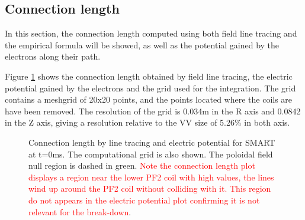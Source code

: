 \documentclass[a4paper,12pt,oneside]{book}
\begin{document}
\subsection{Connection length}

In this section, the connection length computed using both field line tracing and the empirical formula will be showed, as well as the potential gained by the electrons along their path.

Figure \ref{fig_L_int} shows the connection length obtained by field line tracing, the electric potential gained by the electrons and the grid used for the integration. The grid contains a meshgrid of 20x20 points, and the points located where the coils are have been removed. The resolution of the grid is 0.034m in the R axis and 0.0842 in the Z axis, giving a resolution relative to the VV size of 5.26\% in both axis.

\begin{figure}[htbp]
\centering
{}
\hfill
{}

\hfill
{}

\centering
{}

\caption{Connection length by line tracing and electric potential for SMART at t=0ms. The computational grid is also shown. The poloidal field null region is dashed in green. \textcolor{red}{Note the connection length plot displays a region near the lower PF2 coil with high values, the lines wind up around the PF2 coil without colliding with it. This region do not appears in the electric potential plot confirming it is not relevant for the break-down}.}
\label{fig_L_int}
\end{figure}
\end{document}
